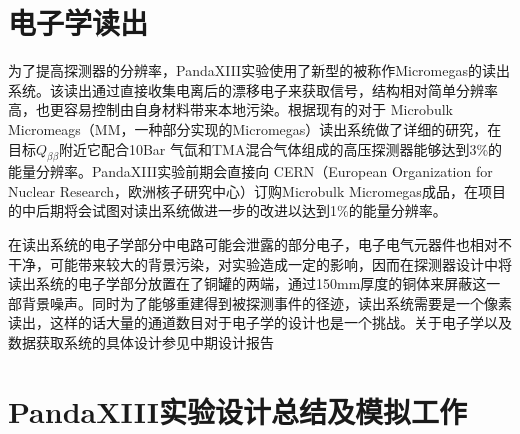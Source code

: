\section{电子学读出}

为了提高探测器的分辨率，PandaXIII实验使用了新型的被称作Micromegas的读出系统。该读出通过直接收集电离后的漂移电子来获取信号，结构相对简单分辨率高，也更容易控制由自身材料带来本地污染。根据现有的对于 Microbulk Micromeags（MM，一种部分实现的Micromegas）读出系统做了详细的研究，在目标$Q_{\beta\beta}$附近它配合10Bar
气氙和TMA混合气体组成的高压探测器能够达到3\%的能量分辨率。PandaXIII实验前期会直接向 CERN（European Organization for Nuclear Research，欧洲核子研究中心）订购Microbulk Micromegas成品，在项目的中后期将会试图对读出系统做进一步的改进以达到1\%的能量分辨率。

在读出系统的电子学部分中电路可能会泄露的部分电子，电子电气元器件也相对不干净，可能带来较大的背景污染，对实验造成一定的影响，因而在探测器设计中将读出系统的电子学部分放置在了铜罐的两端，通过150mm厚度的铜体来屏蔽这一部背景噪声。同时为了能够重建得到被探测事件的径迹，读出系统需要是一个像素读出，这样的话大量的通道数目对于电子学的设计也是一个挑战。关于电子学以及数据获取系统的具体设计参见中期设计报告\supercite{cdr}

\section{PandaXIII实验设计总结及模拟工作}

